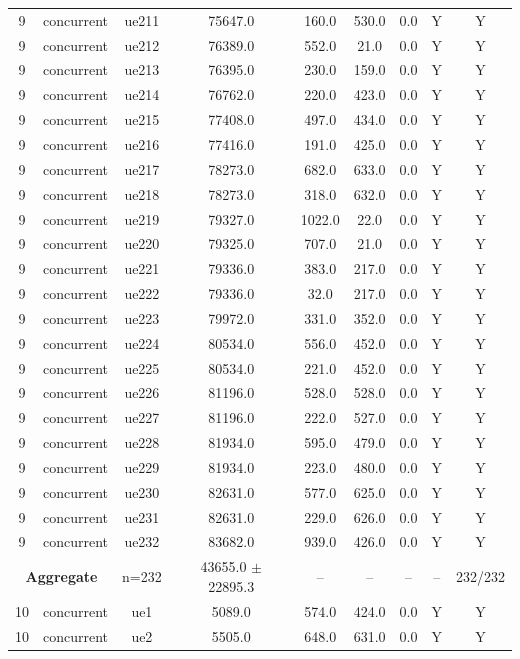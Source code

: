 \begin{table}[ht]
\begin{tabular}{|c|c|c|c|c|c|c|c|c|}
9 & concurrent & ue211 & 75647.0 & 160.0 & 530.0 & 0.0 & Y & Y \\
9 & concurrent & ue212 & 76389.0 & 552.0 & 21.0 & 0.0 & Y & Y \\
9 & concurrent & ue213 & 76395.0 & 230.0 & 159.0 & 0.0 & Y & Y \\
9 & concurrent & ue214 & 76762.0 & 220.0 & 423.0 & 0.0 & Y & Y \\
9 & concurrent & ue215 & 77408.0 & 497.0 & 434.0 & 0.0 & Y & Y \\
9 & concurrent & ue216 & 77416.0 & 191.0 & 425.0 & 0.0 & Y & Y \\
9 & concurrent & ue217 & 78273.0 & 682.0 & 633.0 & 0.0 & Y & Y \\
9 & concurrent & ue218 & 78273.0 & 318.0 & 632.0 & 0.0 & Y & Y \\
9 & concurrent & ue219 & 79327.0 & 1022.0 & 22.0 & 0.0 & Y & Y \\
9 & concurrent & ue220 & 79325.0 & 707.0 & 21.0 & 0.0 & Y & Y \\
9 & concurrent & ue221 & 79336.0 & 383.0 & 217.0 & 0.0 & Y & Y \\
9 & concurrent & ue222 & 79336.0 & 32.0 & 217.0 & 0.0 & Y & Y \\
9 & concurrent & ue223 & 79972.0 & 331.0 & 352.0 & 0.0 & Y & Y \\
9 & concurrent & ue224 & 80534.0 & 556.0 & 452.0 & 0.0 & Y & Y \\
9 & concurrent & ue225 & 80534.0 & 221.0 & 452.0 & 0.0 & Y & Y \\
9 & concurrent & ue226 & 81196.0 & 528.0 & 528.0 & 0.0 & Y & Y \\
9 & concurrent & ue227 & 81196.0 & 222.0 & 527.0 & 0.0 & Y & Y \\
9 & concurrent & ue228 & 81934.0 & 595.0 & 479.0 & 0.0 & Y & Y \\
9 & concurrent & ue229 & 81934.0 & 223.0 & 480.0 & 0.0 & Y & Y \\
9 & concurrent & ue230 & 82631.0 & 577.0 & 625.0 & 0.0 & Y & Y \\
9 & concurrent & ue231 & 82631.0 & 229.0 & 626.0 & 0.0 & Y & Y \\
9 & concurrent & ue232 & 83682.0 & 939.0 & 426.0 & 0.0 & Y & Y \\
\multicolumn{2}{|c|}{\textbf{Aggregate}} & n=232 & 43655.0 $\pm$ 22895.3 & -- & -- & -- & -- & 232/232 \\
\hline
10 & concurrent & ue1 & 5089.0 & 574.0 & 424.0 & 0.0 & Y & Y \\
10 & concurrent & ue2 & 5505.0 & 648.0 & 631.0 & 0.0 & Y & Y \\

\end{tabular}
\end{table}
